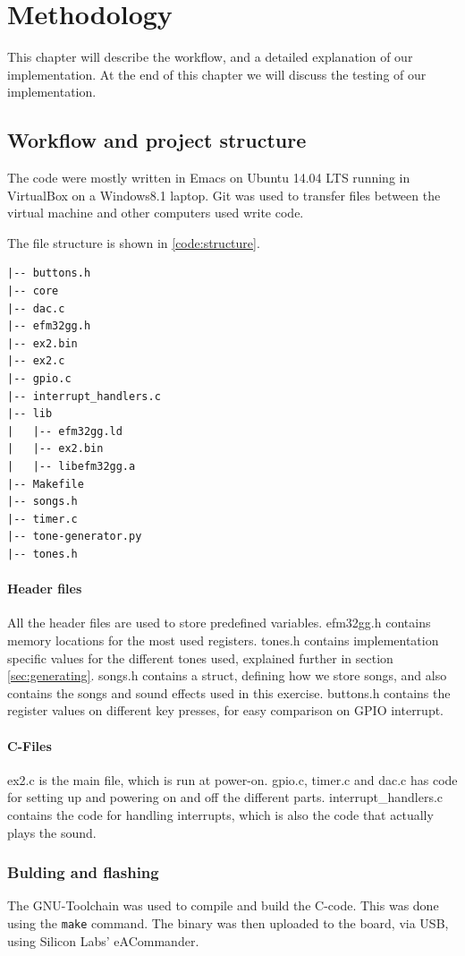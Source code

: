 \chapter{Methodology}
This chapter will describe the workflow, and a detailed explanation of our implementation. At the end of this chapter we will discuss the testing of our implementation.
\section{Workflow and project structure}
The code were mostly written in Emacs on Ubuntu 14.04 LTS running in VirtualBox on a Windows8.1 laptop. Git was used to transfer files between the virtual machine and other computers used write code.

The file structure is shown in \ref{code:structure}. 
\begin{lstlisting}[caption={Project structure}, label={code:structure}]
|-- buttons.h
|-- core
|-- dac.c
|-- efm32gg.h
|-- ex2.bin
|-- ex2.c
|-- gpio.c
|-- interrupt_handlers.c
|-- lib
|   |-- efm32gg.ld
|   |-- ex2.bin
|   |-- libefm32gg.a
|-- Makefile
|-- songs.h
|-- timer.c
|-- tone-generator.py
|-- tones.h
\end{lstlisting}

\subsubsection{Header files}
All the header files are used to store predefined variables. efm32gg.h contains memory locations for the most used registers. 
tones.h contains implementation specific values for the different tones used, explained further in section \ref{sec:generating}. 
songs.h contains a struct, defining how we store songs, and also contains the songs and sound effects used in this exercise.
buttons.h contains the register values on different key presses, for easy comparison on GPIO interrupt.

\subsubsection{C-Files}
ex2.c is the main file, which is run at power-on. 
gpio.c, timer.c and dac.c has code for setting up and powering on and off the different parts.
interrupt_handlers.c contains the code for handling interrupts, which is also the code that actually plays the sound.

\subsection{Bulding and flashing}
\label{sec:bulding}
The GNU-Toolchain was used to compile and build the C-code. This was done using the \texttt{make} command. The binary was then uploaded to the board, via USB, using Silicon Labs' eACommander.

